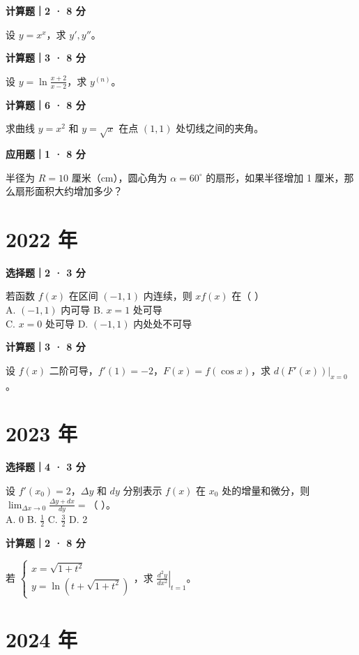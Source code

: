 \textbf{计算题｜2 · 8 分}

设 $y = x^x$，求 $y', y''$。


\textbf{计算题｜3 · 8 分}

设 $y = \ln\frac{x+2}{x-2}$，求 $y^{(n)}$。


\textbf{计算题｜6 · 8 分}

求曲线 $y = x^2$ 和 $y = \sqrt{x}$ 在点 $(1, 1)$ 处切线之间的夹角。


\textbf{应用题｜1 · 8 分}

半径为 $R = 10$ 厘米（cm），圆心角为 $\alpha = 60^\circ$ 的扇形，如果半径增加 1 厘米，那么扇形面积大约增加多少？


\section*{2022 年}


\textbf{选择题｜2 · 3 分}

若函数 $f(x)$ 在区间 $(-1, 1)$ 内连续，则 $xf(x)$ 在（ \quad ）\\
A. $(-1, 1)$ 内可导 \quad B. $x = 1$ 处可导\\
C. $x = 0$ 处可导 \quad D. $(-1, 1)$ 内处处不可导


\textbf{计算题｜3 · 8 分}

设 $f(x)$ 二阶可导，$f'(1) = -2$，$F(x) = f(\cos x)$，求 $\left. d(F'(x)) \right|_{x=0}$。


\section*{2023 年}


\textbf{选择题｜4 · 3 分}

设 $f'(x_0) = 2$，$\Delta y$ 和 $dy$ 分别表示 $f(x)$ 在 $x_0$ 处的增量和微分，则 $\lim_{\Delta x \to 0} \frac{\Delta y + dx}{dy} =$（ \quad ）。\\
A. 0 \quad B. $\frac{1}{2}$ \quad C. $\frac{3}{2}$ \quad D. 2


\textbf{计算题｜2 · 8 分}

若 $\begin{cases} x = \sqrt{1+t^2} \\ y = \ln(t + \sqrt{1+t^2}) \end{cases}$，求 $\left. \frac{d^2y}{dx^2} \right|_{t=1}$。


\section*{2024 年}


